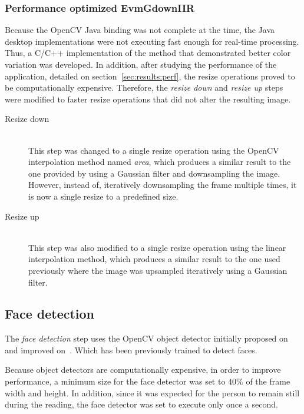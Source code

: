 \subsubsection{Performance optimized EvmGdownIIR} \label{sec:impl:evm:final}

Because the OpenCV Java binding was not complete at the time, the Java desktop
implementations were not executing fast enough for real-time processing. Thus,
a C/C++ implementation of the method that demonstrated better color variation
was developed. In addition, after studying the performance of the application,
detailed on section~\ref{sec:results:perf}, the resize operations proved to be
computationally expensive. Therefore, the \emph{resize down} and
\emph{resize up} steps were modified to faster resize operations that did not
alter the resulting image.

\begin{description}
  \item[Resize down]\hfill\\
        This step was changed to a single resize operation using the
        OpenCV interpolation method named \emph{area}, which produces a similar
        result to the one provided by using a Gaussian filter and downsampling
        the image. However, instead of, iteratively downsampling the frame
        multiple times, it is now a single resize to a predefined size.

  \item[Resize up]\hfill\\
        This step was also modified to a single resize operation using the
        linear interpolation method, which produces a similar result to the
        one used previously where the image was upsampled iteratively using
        a Gaussian filter.
\end{description}

\subsection{Face detection} \label{sec:impl:face}

The \emph{face detection} step uses the OpenCV object detector initially
proposed on~\cite{Viola2001Rapid} and improved on~\cite{Lienhart2002Extended}.
Which has been previously trained to detect faces.

Because object detectors are computationally expensive, in order to
improve performance, a minimum size for the face detector was set to $40\%$
of the frame width and height. In addition, since it was expected for the
person to remain still during the reading, the face detector was set to execute
only once a second.

